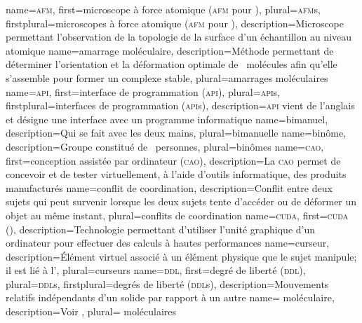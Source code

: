 %
{%
	name={\textsc{afm}},
	first={microscope à force atomique (\textsc{afm} pour )},%
	plural={\textsc{afm}s},%
	firstplural={microscopes à force atomique (\textsc{afm} pour )},%
	description={Microscope permettant l'observation de la topologie de la surface d'un échantillon au niveau atomique}
}
%
{%
	name={amarrage moléculaire},%
	description={Méthode permettant de déterminer l'orientation et la déformation optimale de ~molécules afin qu'elle s'assemble pour former un complexe stable},%
	plural={amarrages moléculaires}%
}
%
{%
	name={\textsc{api}},%
	first={interface de programmation (\textsc{api})},%
	plural={\textsc{api}s},%
	firstplural={interfaces de programmation (\textsc{api}s)},%
	description={\textsc{api} vient de l'anglais  et désigne une interface avec un programme informatique}%
}
%
{%
	name={bimanuel},%
	description={Qui se fait avec les deux mains},%
	plural={bimanuelle}%
}
%
{%
	name={binôme},%
	description={Groupe constitué de ~personnes},%
	plural={binômes}%
}
%
{%
	name={\textsc{cao}},%
	first={conception assistée par ordinateur (\textsc{cao})},%
	description={La \textsc{cao} permet de concevoir et de tester virtuellement, à l'aide d'outils informatique, des produits manufacturés}%
}
%
{%
	name={conflit de coordination},%
	description={Conflit entre deux sujets qui peut survenir lorsque les deux sujets tente d'accéder ou de déformer un objet au même instant},%
	plural={conflits de coordination}%
}
%
{%
	name={\textsc{cuda}},%
	first={\textsc{cuda} ()},%
	description={Technologie permettant d'utiliser l'unité graphique d'un ordinateur pour effectuer des calculs à hautes performances}%
}
%
{%
	name={curseur},%
	description={Élément virtuel associé à un élément physique que le sujet manipule; il est lié à l'},%
	plural={curseurs}%
}
%
{%
	name={\textsc{ddl}},%
	first={degré de liberté (\textsc{ddl})},%
	plural={\textsc{ddl}s},%
	firstplural={degrés de liberté (\textsc{ddl}s)},%
	description={Mouvements relatifs indépendants d'un solide par rapport à un autre}%
}
%
{%
	name={ moléculaire},%
	description={Voir },%
	plural={ moléculaires}%
}
